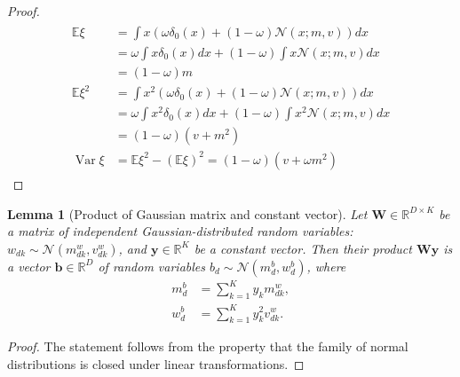 \documentclass[letterpaper]{article}
\newtheorem{lemma}{Lemma}
\begin{document}
\begin{proof}
\begin{align*}
\begin{split}
\mathbb{E}\xi &= \int x (\omega \delta_0(x) + (1 - \omega)\mathcal{N}(x; m, v))dx \\
& = \omega \int x \delta_0(x)dx + (1 - \omega)\int x \mathcal{N}(x; m, v)dx \\
& = (1-\omega)m \\
\mathbb{E}\xi^2 &= \int x^2 (\omega \delta_0(x) + (1 - \omega)\mathcal{N}(x; m, v))dx \\
& = \omega \int x^2 \delta_0(x)dx + (1 - \omega)\int x^2 \mathcal{N}(x; m, v)dx \\
& = (1-\omega)(v + m^2) \\
\operatorname{Var}\xi &= \mathbb{E}\xi^2 - \left(\mathbb{E}\xi\right)^2 = (1-\omega)(v + \omega m^2)
\end{split}
\end{align*}
\end{proof}

 \begin{lemma}[Product of Gaussian matrix and constant vector]
 \label{thm:matrix_const}
 Let $\mathbf{W} \in \mathbb{R}^{D \times K}$ be a matrix of independent Gaussian-distributed random variables: $w_{dk} \sim \mathcal{N}(m^w_{dk}, v^w_{dk})$, and $\mathbf{y} \in \mathbb{R}^K$ be a constant vector. Then their product $\mathbf{W} \mathbf{y}$ is a vector $\mathbf{b} \in \mathbb{R}^{D}$ of random variables $b_d \sim \mathcal{N}(m^b_d, w^b_d)$, where 
\begin{subequations}
\begin{align}
m^b_d &= \sum_{k=1}^Ky_k m^w_{dk}, \\
w^b_d &= \sum_{k=1}^Ky_k^2v^w_{dk}.
 \end{align}
\end{subequations}
 
 \end{lemma}
 \begin{proof}
 	The statement follows from the property that the family of normal distributions is closed under linear transformations.
 \end{proof}
 
\end{document}
